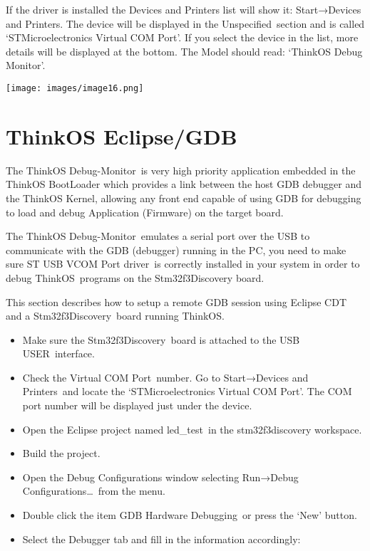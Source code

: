 {If the driver is installed the Devices and Printers list will show it:
Start}{→Devices and Printers. The device will be displayed in the
}{Unspecified}{~section and is called `}{STMicroelectronics Virtual COM
Port}{'. If you select the device in the list, more details will be
displayed at the bottom. The Model should read: `}{ThinkOS Debug
Monitor}{'.}

{\texttt{[image: images/image16.png]}}

\hypertarget{h.2jxsxqh}{\section{\texorpdfstring{{ThinkOS
Eclipse/GDB}}{ThinkOS Eclipse/GDB}}\label{h.2jxsxqh}}

{The }{ThinkOS Debug-Monitor}{~is very high priority application
embedded in the }{ThinkOS BootLoader }{which provides a link between the
host GDB debugger and the ThinkOS Kernel, allowing any front end capable
of using GDB for debugging to load and debug Application (Firmware) on
the target board.}

{The }{ThinkOS Debug-Monitor}{~emulates a serial port over the USB to
communicate with the GDB (debugger) running in the PC, you need to make
sure }{ST USB VCOM Port driver}{~is correctly installed in your system
in order to debug }{ThinkOS}{~programs on the Stm32f3Discovery board.}

{This section describes how to setup a remote GDB session using Eclipse
CDT and a }{Stm32f3Discovery}{~board running }{ThinkOS}{.}

\begin{itemize}
\tightlist
\item
  {Make sure the }{Stm32f3Discovery}{~board is attached to the }{USB
  USER}{~interface.}
\item
  {Check the }{Virtual COM Port}{~number. Go to }{Start}{→}{Devices and
  Printers}{~and locate the `}{STMicroelectronics Virtual COM Port}{'.
  The COM port number will be displayed just under the device.}
\item
  {Open the Eclipse project named }{led\_test}{~in the stm32f3discovery
  workspace.}
\item
  {Build the project.}
\item
  {Open the Debug Configurations window selecting }{Run}{→}{Debug
  Configurations\ldots{}}{~from the menu.}
\item
  {Double click the item }{GDB Hardware Debugging}{~or press the `New'
  button.}
\item
  {Select the Debugger tab and fill in the information accordingly:}
\end{itemize}

